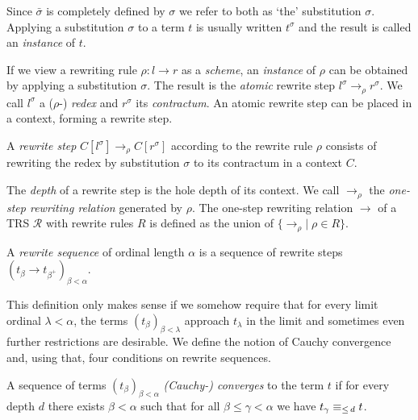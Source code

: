 Since $\bar{\sigma}$ is completely defined by $\sigma$ we refer to both as
`the' substitution $\sigma$.
Applying a substitution $\sigma$ to a term $t$ is usually written
$t^\sigma$ and the result is called an \emph{instance} of $t$.

If we view a rewriting rule $\rho : l \rightarrow r$ as a \emph{scheme}, an
\emph{instance} of $\rho$ can be obtained by applying a substitution
$\sigma$. The result is the \emph{atomic} rewrite step $l^\sigma
\rightarrow_\rho r^\sigma$. We call $l^\sigma$ a ($\rho$-) \emph{redex} and
$r^\sigma$ its \emph{contractum}. An atomic rewrite step can be placed in a
context, forming a rewrite step.

\begin{definition}%
A \emph{rewrite step} $C[l^\sigma] \rightarrow_\rho C[r^\sigma]$ according to
the rewrite rule $\rho$ consists of rewriting the redex by substitution
$\sigma$ to its contractum in a context $C$.
\end{definition}

The \emph{depth} of a rewrite step is the hole depth of its context.
We call $\rightarrow_\rho$ the \emph{one-step rewriting relation} generated by
$\rho$. The one-step rewriting relation $\rightarrow$ of a TRS $\mathcal{R}$
with rewrite rules $R$ is defined as the union of $\{ \rightarrow_\rho | \;
\rho \in R \}$.

\begin{definition}%
A \emph{rewrite sequence} of ordinal length $\alpha$ is a sequence of rewrite
steps $(t_\beta \rightarrow t_{\beta^+})_{\beta < \alpha}$.
\end{definition}

This definition only makes sense if we somehow require that for every limit
ordinal $\lambda < \alpha$, the terms $(t_\beta)_{\beta < \lambda}$ approach
$t_\lambda$ in the limit and sometimes even further restrictions are
desirable. We define the notion of Cauchy convergence and, using that, four
conditions on rewrite sequences.

\begin{definition}\label{def:cauchy}%
  A sequence of terms $(t_\beta)_{\beta < \alpha}$ \emph{(Cauchy-) converges}
  to the term $t$ if for every depth $d$ there exists $\beta < \alpha$ such
  that for all $\beta \le \gamma < \alpha$ we have $t_\gamma \equiv_{\le \, d} t$.
\end{definition}

